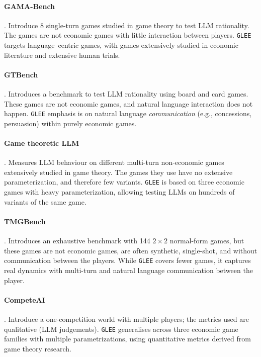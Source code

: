 \paragraph{GAMA-Bench} \cite{huang2024far}. Introduce 8 single-turn games studied in game theory to test LLM rationality. The games are not economic games with little interaction between players.
\texttt{GLEE} targets language–centric games, with games extensively studied in economic literature and extensive human trials.

\paragraph{GTBench} \cite{duan2024gtbench}. Introduces a benchmark to test LLM rationality using board and card games. These games are not economic games, and natural language interaction does not happen.
\texttt{GLEE} emphasis is on natural language \emph{communication} (e.g., concessions, persuasion) within purely economic games.

\paragraph{Game theoretic LLM} \cite{hua2024game}. Measures LLM behaviour on different multi-turn non-economic games extensively studied in game theory. The games they use have no extensive parameterization, and therefore few variants.
\texttt{GLEE} is based on three economic games with heavy parameterization, allowing testing LLMs on hundreds of variants of the same game.

\paragraph{TMGBench} \cite{wang2024tmgbench}. Introduces an exhaustive benchmark with 144 $2 \times 2$ normal-form games, but these games are not economic games, are often synthetic, single-shot, and without communication between the players.
While \texttt{GLEE} covers fewer games, it captures real dynamics with multi-turn and natural language communication between the player.

\paragraph{CompeteAI} \cite{Zhao2023CompeteAIUT}. Introduce a one-competition world with multiple players; the metrics used are qualitative (LLM judgements).
\texttt{GLEE} generalises across three economic game families with multiple parametrizations, using quantitative metrics derived from game theory research. 


